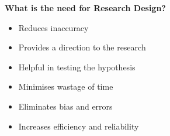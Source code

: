 \documentclass[conference]{IEEEtran}
\begin{document}
\textbf{What is the need for Research Design?}
\begin{itemize}

	
		\item Reduces inaccuracy\\
		\item  Provides a direction to the research\\
		\item Helpful in testing the hypothesis\\
		\item Minimises wastage of time\\
		\item Eliminates bias and errors\\
		\item Increases efficiency and reliability\\
			
	



\end{itemize}
\end{document}
